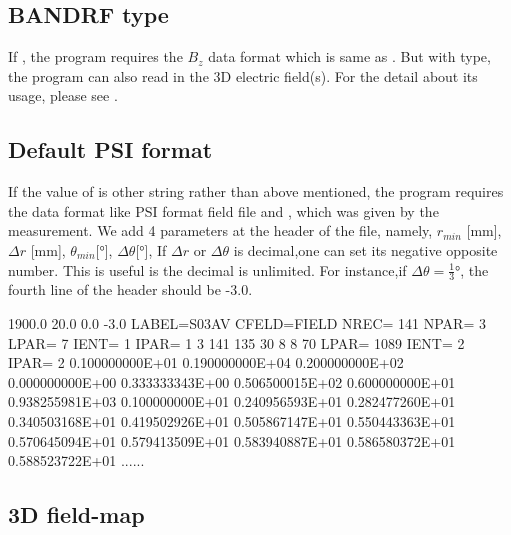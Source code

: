 \subsection{BANDRF type}
If ,  the program requires the $B_z$ data format which is same as .
But with  type, the program can also read in the 3D electric field(s).
For the detail about its usage, please see .

\subsection{Default PSI format}
If the value of  is other string rather than above mentioned, the program requires the data format like  PSI format field file  and , which was given by the measurement.
We add 4 parameters at the header of the file, namely,
$r_{min}$ [\si{\milli\meter}], $\Delta r$ [\si{\milli\meter}], $\theta_{min}$[\si{\degree}], $\Delta \theta$[\si{\degree}],
If $\Delta r$ or $\Delta \theta$ is decimal,one can set its negative opposite number. This is useful is the decimal is unlimited.
For instance,if $\Delta \theta = \frac{1}{3}\si{\degree}$, the fourth line of the header should be -3.0.

\begin{example}
1900.0
20.0
0.0
-3.0
 LABEL=S03AV
 CFELD=FIELD     NREC=  141      NPAR=    3
 LPAR=    7      IENT=    1      IPAR=    1
               3             141             135              30               8
               8              70
 LPAR= 1089      IENT=    2      IPAR=    2
 0.100000000E+01 0.190000000E+04 0.200000000E+02 0.000000000E+00 0.333333343E+00
 0.506500015E+02 0.600000000E+01 0.938255981E+03 0.100000000E+01 0.240956593E+01
 0.282477260E+01 0.340503168E+01 0.419502926E+01 0.505867147E+01 0.550443363E+01
 0.570645094E+01 0.579413509E+01 0.583940887E+01 0.586580372E+01 0.588523722E+01
                        ......
\end{example}

\subsection{3D field-map}


